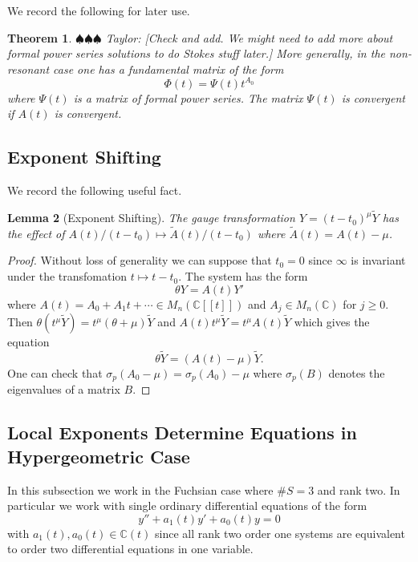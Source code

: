 \documentclass[12pt]{book}
\newcommand{\taylor}[1]{{\color{blue} \sf $\spadesuit\spadesuit\spadesuit$ Taylor: [#1]}}
\numberwithin{equation}{section}
\newtheorem{theorem}{Theorem}[subsection]
\newtheorem{lemma}[theorem]{Lemma}
\theoremstyle{definition}
\theoremstyle{remark}
\newcommand{\CC}{\mathbb{C}}
\begin{document}
We record the following for later use. 
\begin{theorem}\taylor{Check and add. We might need to add more about formal power series solutions to do Stokes stuff later.}
	More generally, in the non-resonant case one has a fundamental matrix of the form 
	$$ \Phi(t) = \Psi(t) t^{A_0} $$
	where $\Psi(t)$ is a matrix of formal power series. 
	The matrix $\Psi(t)$ is convergent if $A(t)$ is convergent.
\end{theorem}

\subsection{Exponent Shifting}
We record the following useful fact.
\begin{lemma}[Exponent Shifting]\label{L:exponent-shifting}
	The gauge transformation $Y=(t-t_0)^{\mu}\widetilde{Y}$ has the effect of $A(t)/(t-t_0)\mapsto \widetilde{A}(t)/(t-t_0)$ where $\widetilde{A}(t) = A(t)-\mu$.
\end{lemma}
\begin{proof}
	Without loss of generality we can suppose that $t_0=0$ since $\infty$ is invariant under the transfomation $t\mapsto t-t_0$. 
	The system has the form 
	 $$ \theta Y = A(t) Y' $$
	where $A(t) = A_0 + A_1 t + \cdots \in M_n(\CC[[t]])$ and $A_j \in M_n(\CC)$ for $j\geq 0$. 
	Then $\theta(t^{\mu}\widetilde{Y}) = t^{\mu}(\theta+\mu)\widetilde{Y}$ and $A(t)t^{\mu}\widetilde{Y} = t^{\mu}A(t)\widetilde{Y}$ which gives the equation
	 $$ \theta \widetilde{Y} = (A(t)-\mu) \widetilde{Y}.$$
	One can check that $\sigma_p(A_0-\mu) = \sigma_p(A_0)-\mu$ where $\sigma_p(B)$ denotes the eigenvalues of a matrix $B$.
\end{proof}

\subsection[Exponents Determine Equations]{Local Exponents Determine Equations in Hypergeometric Case}
In this subsection we work in the Fuchsian case where $\#S=3$ and rank two. 
In particular we work with single ordinary differential equations of the form
 $$ y'' + a_1(t)y' + a_0(t) y =0 $$
with $a_1(t),a_0(t) \in \CC(t)$ since all rank two order one systems are equivalent to order two differential equations in one variable.
\end{document}
